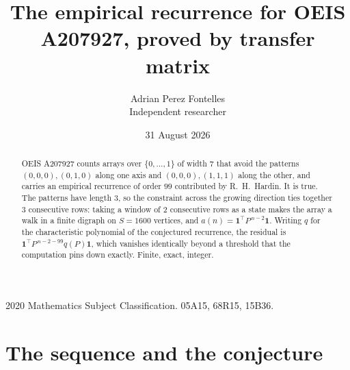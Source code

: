 \documentclass[11pt,a4paper]{article}
\title{The empirical recurrence for OEIS A207927, proved by transfer matrix}
\author{Adrian Perez Fontelles\\ \small Independent researcher}
\date{31 August 2026}
\theoremstyle{plain}
\theoremstyle{definition}
\begin{document}
\maketitle

\begin{abstract}
OEIS A207927 counts arrays over $\{0,\dots,1\}$ of width $7$ that avoid the patterns
$(0,0,0), (0,1,0)$ along one axis and $(0,0,0), (1,1,1)$ along the other, and carries an empirical recurrence of
order $99$ contributed by R.~H.~Hardin. It is true. The patterns have length $3$, so
the constraint across the growing direction ties together $3$ consecutive rows: taking a
window of $2$ consecutive rows as a state makes the array a walk in a finite digraph
on $S=1600$ vertices, and $a(n)=\mathbf{1}^{\!\top}P^{\,n-2}\mathbf{1}$. Writing $q$
for the characteristic polynomial of the conjectured recurrence, the residual is
$\mathbf{1}^{\!\top}P^{\,n-2-99}q(P)\mathbf{1}$, which vanishes identically
beyond a threshold that the computation pins down exactly. Finite, exact, integer.
\end{abstract}

\noindent\small 2020 Mathematics Subject Classification. 05A15, 68R15, 15B36.\normalsize

\section{The sequence and the conjecture}
\end{document}
